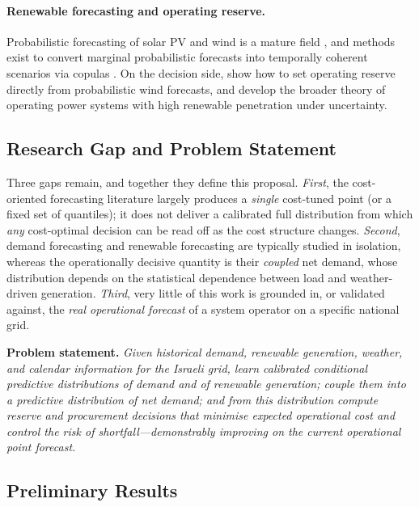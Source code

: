 \documentclass[12pt,a4paper]{article}
\begin{document}
\paragraph{Renewable forecasting and operating reserve.}
Probabilistic forecasting of solar PV and wind is a mature field
\parencite{antonanzas2016review,hong2020energy}, and methods exist to convert marginal
probabilistic forecasts into temporally coherent scenarios via copulas
\parencite{pinson2009scenarios,nelsen2006copulas}. On the decision side,
\textcite{matos2011reserve} show how to set operating reserve directly from probabilistic
wind forecasts, and \textcite{morales2014integrating} develop the broader theory of
operating power systems with high renewable penetration under uncertainty.

\subsection{Research Gap and Problem Statement}
\label{sec:gap}

Three gaps remain, and together they define this proposal. \emph{First}, the cost-oriented
forecasting literature largely produces a \emph{single} cost-tuned point (or a fixed set
of quantiles); it does not deliver a calibrated full distribution from which \emph{any}
cost-optimal decision can be read off as the cost structure changes. \emph{Second}, demand
forecasting and renewable forecasting are typically studied in isolation, whereas the
operationally decisive quantity is their \emph{coupled} net demand, whose distribution
depends on the statistical dependence between load and weather-driven generation.
\emph{Third}, very little of this work is grounded in, or validated against, the
\emph{real operational forecast} of a system operator on a specific national grid.

\medskip\noindent\textbf{Problem statement.} \emph{Given historical demand, renewable
generation, weather, and calendar information for the Israeli grid, learn calibrated
conditional predictive distributions of demand and of renewable generation; couple them
into a predictive distribution of net demand; and from this distribution compute reserve
and procurement decisions that minimise expected operational cost and control the risk of
shortfall---demonstrably improving on the current operational point forecast.}

\subsection{Preliminary Results}
\label{sec:prelim}
\end{document}

